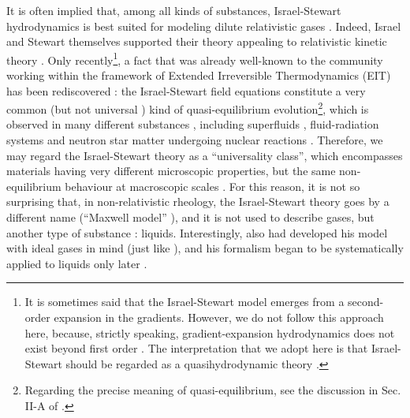 \documentclass[a4paper, amsfonts, amssymb, amsmath, reprint, showkeys, nofootinbib, twoside, onecolumn, notitlepage]{revtex4-1}
\theoremstyle{definition}
\theoremstyle{theorem}
\begin{document}
It is often implied that, among all kinds of substances, Israel-Stewart hydrodynamics is best suited for modeling dilute relativistic gases \cite{Liu1986,Salmonson1991,rezzolla_book,Stricker2019,Denicol2012Boltzmann}. 
 Indeed, Israel and Stewart themselves supported their theory appealing to relativistic kinetic theory  \cite{Stewart_1977,Israel_Stewart_1979}. Only recently\footnote{
    It is sometimes said \cite{Baier2008} that the Israel-Stewart model emerges from a second-order expansion in the gradients. However, we do not follow this approach here, because, strictly speaking, gradient-expansion hydrodynamics does not exist beyond first order \cite{KovtunStickiness2011}. The interpretation that we adopt here is that Israel-Stewart should be regarded as a quasihydrodynamic theory \cite{Grozdanov2019,GavassinoQuasi2022}.}, 
a fact that was already well-known to the community working within the framework of Extended Irreversible Thermodynamics (EIT) has been rediscovered \cite{Jou_Extended,Muller_book,Salazar2020,GavassinoFronntiers2021}:
the Israel-Stewart field equations constitute a very common (but not universal \cite{Heller2014,GavassinoQuasi2022}) kind of quasi-equilibrium evolution\footnote{
    Regarding the precise meaning of quasi-equilibrium, see the discussion in Sec. II-A of \citep{BulkGavassino}.}, 
which is observed in many different substances \cite{Grozdanov2019,GavassinoFronntiers2021}, including superfluids \citep{GavassinoKhalatnikov2022}, fluid-radiation systems \citep{GavassinoRadiazione} and neutron star matter undergoing nuclear reactions \citep{Camelio2022,CamelioSecondo2022}. 
Therefore, we may regard the Israel-Stewart theory as a ``universality class'', which encompasses materials having very different microscopic properties, but the same non-equilibrium behaviour at macroscopic scales \cite{Denicol_Relaxation_2011}. 
For this reason, it is not so surprising that, in non-relativistic rheology, the Israel-Stewart theory goes by a different name (``Maxwell model'' \cite{maxwell_1867,Nettleton1959,Roylance2001}), and it is not used to describe gases, but another type of substance \cite{Frenkel_book,BaggioliHolography2019,BAGGIOLI20201,landau7}: liquids. 
Interestingly, \citet{maxwell_1867} also had developed his model with ideal gases in mind (just like \citet{Israel_Stewart_1979}), and his formalism began to be systematically applied to liquids only later \cite{Frenkel_book,Nettleton1959,Truesdell1965}.
\end{document}
